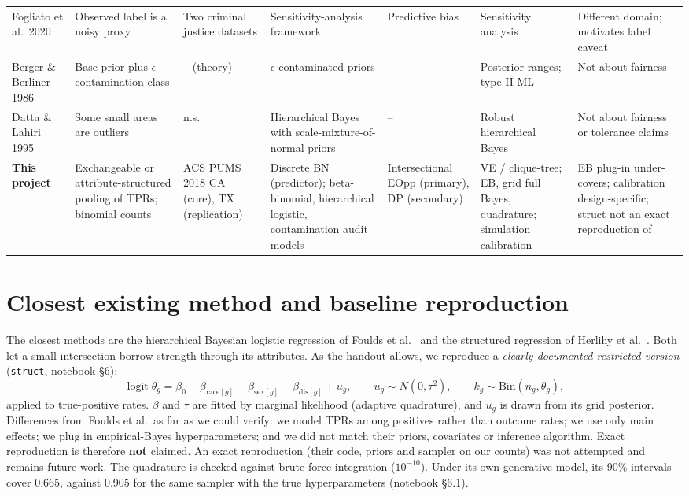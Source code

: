 \documentclass[10pt]{article}
\begin{document}
\begin{landscape}
\begin{longtable}{@{}L{2.9cm}L{3.2cm}L{2.5cm}L{3.3cm}L{2.8cm}L{2.9cm}L{3.6cm}@{}}
Fogliato et al.\ 2020~\cite{fogliato2020} & Observed label is a noisy proxy & Two criminal justice datasets & Sensitivity-analysis framework & Predictive bias & Sensitivity analysis & Different domain; motivates label caveat \\
Berger \& Berliner 1986~\cite{berger1986} & Base prior plus $\epsilon$-contamination class & -- (theory) & $\epsilon$-contaminated priors & -- & Posterior ranges; type-II ML & Not about fairness \\
Datta \& Lahiri 1995~\cite{datta1995} & Some small areas are outliers & n.s. & Hierarchical Bayes with scale-mixture-of-normal priors & -- & Robust hierarchical Bayes & Not about fairness or tolerance claims \\
\midrule
\textbf{This project} & Exchangeable or attribute-structured pooling of TPRs; binomial counts & ACS PUMS 2018 CA (core), TX (replication) & Discrete BN (predictor); beta-binomial, hierarchical logistic, contamination audit models & Intersectional EOpp (primary), DP (secondary) & VE / clique-tree; EB, grid full Bayes, quadrature; simulation calibration & EB plug-in under-covers; calibration design-specific; struct not an exact reproduction of~\cite{foulds2020bayes} \\
\end{longtable}
\end{landscape}

\section{Closest existing method and baseline reproduction}\label{sec:closest}
The closest methods are the hierarchical Bayesian logistic regression of Foulds et al.~\cite{foulds2020bayes} and the
structured regression of Herlihy et al.~\cite{herlihy2024}. Both let a small intersection borrow strength through its
attributes. As the handout allows, we reproduce a \emph{clearly documented restricted version} (\texttt{struct}, notebook
\S6):
\[
\operatorname{logit}\theta_g=\beta_0+\beta_{\text{race}[g]}+\beta_{\text{sex}[g]}+\beta_{\text{dis}[g]}+u_g,\qquad
u_g\sim N(0,\tau^2),\qquad k_g\sim\text{Bin}(n_g,\theta_g),
\]
applied to true-positive rates. $\beta$ and $\tau$ are fitted by marginal likelihood (adaptive quadrature), and $u_g$ is
drawn from its grid posterior. Differences from Foulds et al.\ as far as we could verify: we model TPRs among positives
rather than outcome rates; we use only main effects; we plug in empirical-Bayes hyperparameters; and we did not match their
priors, covariates or inference algorithm. Exact reproduction is therefore \textbf{not} claimed.
An exact reproduction (their code, priors and sampler on our counts) was not attempted and remains future work.
The quadrature is checked against brute-force integration ($10^{-10}$). Under its own generative model, its 90\% intervals
cover 0.665, against 0.905 for the same sampler with the true hyperparameters (notebook \S6.1).
\end{document}

